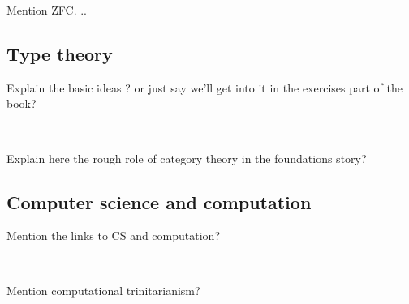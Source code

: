 Mention ZFC.
..

\subsection{Type theory}

Explain the basic ideas ?
or just say we'll get into it in the exercises part of the book?

\

Explain here the rough role of category theory in the foundations story?

\subsection{Computer science and computation}

Mention the links to CS and computation?

\

Mention computational trinitarianism?
